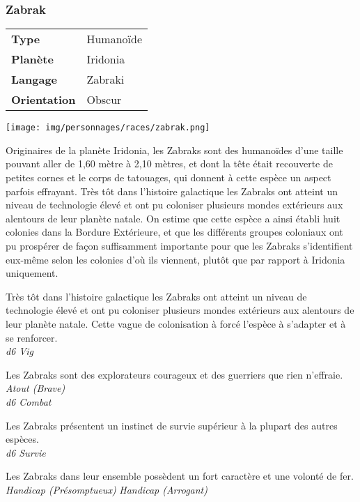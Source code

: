 \subsubsection{Zabrak}
\begin{samepage}
	\begin{flushright}
		\begin{tabular}{ l l }
			\textbf{Type} 			& Humanoïde \\
		   	\textbf{Planète} 		& Iridonia \\
		   	\textbf{Langage} 		& Zabraki \\
		   	\textbf{Orientation} 	& Obscur \\
		\end{tabular}
	\end{flushright}
	\vspace{-6\baselineskip}
	\texttt{[image: img/personnages/races/zabrak.png]}
\end{samepage}

Originaires de la planète Iridonia, les Zabraks sont des humanoïdes d’une taille pouvant aller de 1,60 mètre à 2,10 mètres, et dont la tête était recouverte de petites cornes et le corps de tatouages, qui donnent à cette espèce un aspect parfois effrayant. Très tôt dans l’histoire galactique les Zabraks ont atteint un niveau de technologie élevé et ont pu coloniser plusieurs mondes extérieurs aux alentours de leur planète natale. On estime que cette espèce a ainsi établi huit colonies dans la Bordure Extérieure, et que les différents groupes coloniaux ont pu prospérer de façon suffisamment importante pour que les Zabraks s’identifient eux-même selon les colonies d’où ils viennent, plutôt que par rapport à Iridonia uniquement.

\begin{description}[align=left]
	\item [Endurance] 				%
		Très tôt dans l’histoire galactique les Zabraks ont atteint un niveau de technologie élevé et ont pu coloniser plusieurs mondes extérieurs aux alentours de leur planète natale. Cette vague de colonisation à forcé l’espèce à s’adapter et à se renforcer.\\
		\textit{d6 Vig}

	\item [Braveheart] 				%
		Les Zabraks sont des explorateurs courageux et des guerriers que rien n’effraie.\\
		\textit{Atout (Brave)}\\
		\textit{d6 Combat}

	\item [Survivor] 				%
		Les Zabraks présentent un instinct de survie supérieur à la plupart des autres espèces.\\
		\textit{d6 Survie}

	\item [Fierté mal placé] 				%
		Les Zabraks dans leur ensemble possèdent un fort caractère et une volonté de fer.\\
		\textit{Handicap (Présomptueux)}
		\textit{Handicap (Arrogant)}
\end{description}